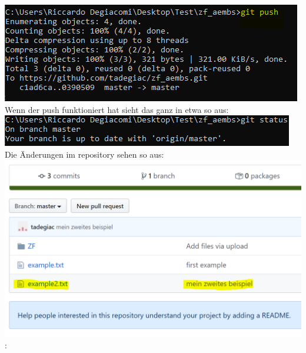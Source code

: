 \documentclass[a4paper, 8pt]{extarticle}
\begin{document}
\begin{multicols*}{3}
\begin{enumerate}
                                \includegraphics[width=1\linewidth, left]{img/git_push.PNG}\\
                            Wenn der push funktioniert hat sieht das ganz in etwa so aus:
                                \includegraphics[width=1\linewidth, left]{img/git_status_3.PNG}\\
                                Die Änderungen im repository sehen so aus:
                                \includegraphics[width=1\linewidth, left]{img/wennallesobeisch.PNG}:
                 \end{enumerate}


\end{multicols*}
\end{document}
